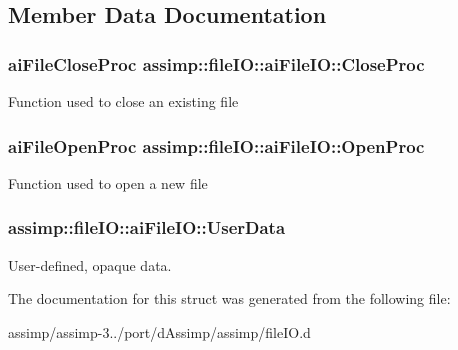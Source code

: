 \subsection{Member Data Documentation}
\hypertarget{structassimp_1_1file_i_o_1_1ai_file_i_o_af31e2165b495651e8230c01983cca077}{
\subsubsection[{Close\+Proc}]{\setlength{\rightskip}{0pt plus 5cm}ai\+File\+Close\+Proc assimp\+::file\+I\+O\+::ai\+File\+I\+O\+::\+Close\+Proc}}\label{structassimp_1_1file_i_o_1_1ai_file_i_o_af31e2165b495651e8230c01983cca077}
Function used to close an existing file \hypertarget{structassimp_1_1file_i_o_1_1ai_file_i_o_ad8781f065fd63d43c93eab38165fb85a}{
\subsubsection[{Open\+Proc}]{\setlength{\rightskip}{0pt plus 5cm}ai\+File\+Open\+Proc assimp\+::file\+I\+O\+::ai\+File\+I\+O\+::\+Open\+Proc}}\label{structassimp_1_1file_i_o_1_1ai_file_i_o_ad8781f065fd63d43c93eab38165fb85a}
Function used to open a new file \hypertarget{structassimp_1_1file_i_o_1_1ai_file_i_o_a361f425266a5926d5188cec69a5cf319}{
\subsubsection[{User\+Data}]{ assimp\+::file\+I\+O\+::ai\+File\+I\+O\+::\+User\+Data}}\label{structassimp_1_1file_i_o_1_1ai_file_i_o_a361f425266a5926d5188cec69a5cf319}
User-\/defined, opaque data. 

The documentation for this struct was generated from the following file\+:\begin{DoxyCompactItemize}
\item 
assimp/assimp-\/3../port/d\+Assimp/assimp/file\+I\+O.\+d\end{DoxyCompactItemize}

